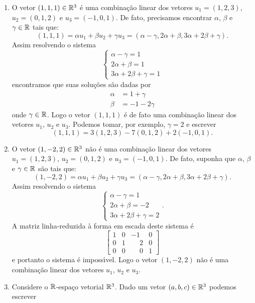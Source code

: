 \begin{exemplo}
	\begin{enumerate}[label={\arabic*})]
		\item O vetor $(1, 1, 1) \in \mathbb{R}^3$ \'e uma combina\c{c}\~ao linear dos vetores $u_1 = (1, 2, 3)$, $u_2 = (0, 1, 2)$ e $u_3 = (-1, 0, 1)$. De fato, precisamos encontrar $\alpha$, $\beta$ e $\gamma \in \mathbb{R}$ tais que:
		\[
			(1, 1, 1) = \alpha u_1 + \beta u_2 + \gamma u_3 = (\alpha - \gamma, 2\alpha + \beta, 3\alpha + 2\beta + \gamma).
		\]
		Assim resolvendo o sistema
		\[
		\begin{cases}
			\alpha - \gamma = 1\\
			2\alpha + \beta = 1\\
			3\alpha + 2\beta + \gamma = 1
		\end{cases}
		\]
		encontramos que suas solu\c{c}\~oes s\~ao dadas por
		\begin{align*}
			\alpha &= 1 + \gamma\\
			\beta &= -1 - 2\gamma
		\end{align*}
		onde $\gamma \in \mathbb{R}$. Logo o vetor $(1, 1, 1)$ \'e de fato uma combina\c{c}\~ao linear dos vetores $u_1$, $u_2$ e $u_3$. Podemos tomar, por exemplo, $\gamma = 2$ e escrever
		\[
			(1, 1, 1) = 3(1, 2, 3) -7(0, 1, 2) + 2(-1, 0 , 1).
		\]
		\item O vetor $(1, -2, 2) \in \mathbb{R}^3$ n\~ao \'e uma combina\c{c}\~ao linear dos vetores $u_1 = (1, 2, 3)$, $u_2 = (0, 1, 2)$ e $u_3 = (-1, 0, 1)$. De fato, suponha que $\alpha$, $\beta$ e $\gamma \in \mathbb{R}$ s\~ao tais que:
		\[
			(1, -2, 2) = \alpha u_1 + \beta u_2 + \gamma u_3 = (\alpha - \gamma, 2\alpha + \beta, 3\alpha + 2\beta + \gamma).
		\]
		Assim resolvendo o sistema
		\[
		\begin{cases}
			\alpha - \gamma = 1\\
			2\alpha + \beta = -2\\
			3\alpha + 2\beta + \gamma = 2
		\end{cases}.
		\]
		A matriz linha-reduzida \`a forma em escada deste sistema \'e
		\[
			\begin{bmatrix}
				1 & 0 & -1 & 0\\
				0 & 1 & \phantom{-}2 & 0\\
				0 & 0 & \phantom{-}0 & 1
			\end{bmatrix}
		\]
		e portanto o sistema \'e imposs{\'\i}vel. Logo o vetor $(1, -2, 2)$ n\~ao \'e uma combina\c{c}\~ao linear dos vetores $u_1$, $u_2$ e $u_3$.
	\item Considere o $\mathbb{R}$-espa\c{c}o vetorial $\mathbb{R}^3$. Dado um vetor $(a, b, c) \in \mathbb{R}^3$ podemos escrever

\end{enumerate}
\end{exemplo}
